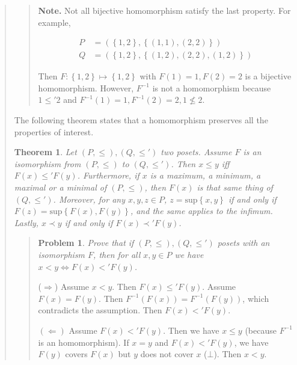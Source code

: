 \documentclass[a4paper, 12pt]{article}
\newtheorem{problem}{Problem}
\newtheorem{theorem}{Theorem}
\newtheorem{problem}{Problem}
\newtheorem{theorem}{Theorem}
\begin{document}
\begin{quote}
\small
\begin{quote}

\textbf{Note.} Not all bijective homomorphism satisfy the last property. For
example, 

\begin{align*}
    P &= \left( \left\{ 1, 2 \right\}, \left\{ (1, 1), (2, 2) \right\}\right) \\
    Q &= \left( \left\{ 1, 2 \right\}, \left\{ (1, 2),(2, 2), (1, 2)
\right\}   \right) 
\end{align*}

Then $F : \left\{ 1, 2 \right\} \mapsto \left\{ 1, 2
\right\} $ with $F(1) = 1, F(2) = 2$ is a bijective homomorphism. However,
$F^{-1}$ is not a homomorphism because $1 \leq' 2$ and $F^{-1}(1) = 1, F^{-1}(2)
= 2, 1 \not\leq 2$.

\end{quote}
\normalsize


The following theorem states that a homomorphism preserves all the properties of
interest.

\begin{theorem}
    Let $(P, \leq), (Q, \leq') $ two posets. Assume $F$ is an isomorphism from
    $(P, \leq) $ to $(Q, \leq') $. Then $x \leq y$ iff $F(x) \leq' F(y)$.
    Furthermore, if $x$ is a maximum, a minimum, a maximal or a minimal of $(P,
    \leq) $, then $F(x)$ is that same thing of $(Q, \leq') $. Moreover, for any
    $x, y, z \in P$, $z = \text{sup}\left\{ x, y \right\} $ if and only if $F(z)
    = \text{sup}\left\{ F(x), F(y) \right\} $, and the same applies to the
    infimum. Lastly, $x \prec y$ if and only if $F(x) \prec' F(y)$.
\end{theorem}


\small
\begin{quote}

\begin{problem}
    Prove that if $(P, \leq) , (Q, \leq') $ posets with an isomorphism $F$, then
    for all $x, y \in P$ we have $x < y \iff F(x) <' F(y)$.
\end{problem}

($\Rightarrow$) Assume $x < y$. Then $F(x) \leq' F(y)$. Assume $F(x) = F(y)$.
Then $F^{-1}(F(x)) = F^{-1}(F(y))$, which contradicts the assumption. Then $F(x) <'
F(y)$.

$(\Leftarrow)$ Assume $F(x) <' F(y)$. Then we have $x \leq y$ (because $F^{-1}$
is an homomorphism). If $x = y$ and $F(x) <' F(y)$, we have $F(y)$ covers $F(x)$
but $y$ does not cover $x$ ($\bot$). Then $x < y$.


\end{quote}
\end{quote}
\end{document}
